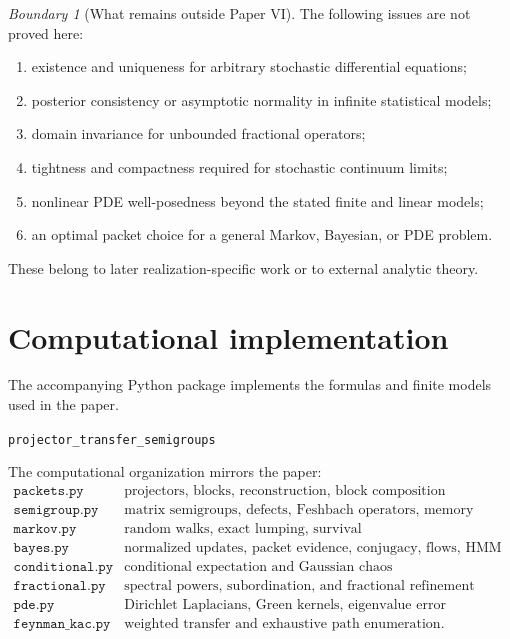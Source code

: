 \documentclass[11pt,a4paper]{article}
\theoremstyle{definition}
\theoremstyle{remark}
\newtheorem{boundary}[theorem]{Boundary}
\begin{document}
\begin{boundary}[What remains outside Paper VI]\label{core:record:050}
The following issues are not proved here:
\begin{enumerate}[leftmargin=2em]
\item existence and uniqueness for arbitrary stochastic differential equations;
\item posterior consistency or asymptotic normality in infinite statistical models;
\item domain invariance for unbounded fractional operators;
\item tightness and compactness required for stochastic continuum limits;
\item nonlinear PDE well-posedness beyond the stated finite and linear models;
\item an optimal packet choice for a general Markov, Bayesian, or PDE problem.
\end{enumerate}
These belong to later realization-specific work or to external analytic theory.
\end{boundary}

\section{Computational implementation}\label{core:section:18}

The accompanying Python package implements the formulas and finite models used in the paper.
\begin{center}
\texttt{projector\_transfer\_semigroups}
\end{center}
The computational organization mirrors the paper:
\[
\begin{array}{c|l}
\texttt{packets.py} & \text{projectors, blocks, reconstruction, block composition}\\
\texttt{semigroup.py} & \text{matrix semigroups, defects, Feshbach operators, memory}\\
\texttt{markov.py} & \text{random walks, exact lumping, survival}\\
\texttt{bayes.py} & \text{normalized updates, packet evidence, conjugacy, flows, HMM}\\
\texttt{conditional.py} & \text{conditional expectation and Gaussian chaos}\\
\texttt{fractional.py} & \text{spectral powers, subordination, and fractional refinement certificates}\\
\texttt{pde.py} & \text{Dirichlet Laplacians, Green kernels, eigenvalue error}\\
\texttt{feynman\_kac.py} & \text{weighted transfer and exhaustive path enumeration}.
\end{array}
\]
\end{document}
